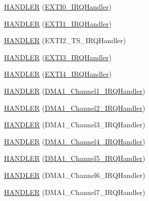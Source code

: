 \begin{DoxyCompactItemize}
\item 
\hyperlink{group___p_i_o_s_ga4d34c7117246e20017f92377a86ef1d8}{H\-A\-N\-D\-L\-E\-R} (\hyperlink{group___p_i_o_s___e_x_t_i_ga17e9789a29a87d2df54f12b94dd1a0b6}{E\-X\-T\-I0\-\_\-\-I\-R\-Q\-Handler})
\item 
\hyperlink{group___p_i_o_s_ga45e5b700a5acc59f46c85542ef3ced58}{H\-A\-N\-D\-L\-E\-R} (\hyperlink{group___p_i_o_s___e_x_t_i_ga49cfdd46eb8d0ef3e1987514aa9343dc}{E\-X\-T\-I1\-\_\-\-I\-R\-Q\-Handler})
\item 
\hyperlink{group___p_i_o_s_ga0447579d55e271d7a793046ae6eca6e4}{H\-A\-N\-D\-L\-E\-R} (E\-X\-T\-I2\-\_\-\-T\-S\-\_\-\-I\-R\-Q\-Handler)
\item 
\hyperlink{group___p_i_o_s_gaad3527eb1b913871844c4e19b1208781}{H\-A\-N\-D\-L\-E\-R} (\hyperlink{group___p_i_o_s___e_x_t_i_ga30c045de96d18ec9c67a7b9e4350920f}{E\-X\-T\-I3\-\_\-\-I\-R\-Q\-Handler})
\item 
\hyperlink{group___p_i_o_s_ga9b52b435e765f418d0b20373ebf7d3de}{H\-A\-N\-D\-L\-E\-R} (\hyperlink{group___p_i_o_s___e_x_t_i_ga290cb997018c8d85d4b965b4a242842f}{E\-X\-T\-I4\-\_\-\-I\-R\-Q\-Handler})
\item 
\hyperlink{group___p_i_o_s_ga9e2d769f4c4643f6f859b5ef04d6d8df}{H\-A\-N\-D\-L\-E\-R} (\hyperlink{pipxtreme_2board__hw__defs_8c_abd49de55f82b1a0be3edaaf34dbe4b14}{D\-M\-A1\-\_\-\-Channel1\-\_\-\-I\-R\-Q\-Handler})
\item 
\hyperlink{group___p_i_o_s_gadf12505dd17ab67ac8f1ef1acd5722b2}{H\-A\-N\-D\-L\-E\-R} (\hyperlink{group___open_pilot_core_ga4055152a9bfe1072e00247cc351276ba}{D\-M\-A1\-\_\-\-Channel2\-\_\-\-I\-R\-Q\-Handler})
\item 
\hyperlink{group___p_i_o_s_gad3ca30cca745b268027f50e556588fa5}{H\-A\-N\-D\-L\-E\-R} (D\-M\-A1\-\_\-\-Channel3\-\_\-\-I\-R\-Q\-Handler)
\item 
\hyperlink{group___p_i_o_s_ga1d58ca450480446a2c488dc53001f493}{H\-A\-N\-D\-L\-E\-R} (\hyperlink{group___tau_labs_core_ga9cdc63af1166aec768f87546a48bec8d}{D\-M\-A1\-\_\-\-Channel4\-\_\-\-I\-R\-Q\-Handler})
\item 
\hyperlink{group___p_i_o_s_ga3d879eb7c368ae3e534bfcdbff172109}{H\-A\-N\-D\-L\-E\-R} (\hyperlink{pipxtreme_2board__hw__defs_8c_a8e3a6d7ba4b5da3ec8decb912bd80943}{D\-M\-A1\-\_\-\-Channel5\-\_\-\-I\-R\-Q\-Handler})
\item 
\hyperlink{group___p_i_o_s_gade543c66fd60c4e916129eafa94a335c}{H\-A\-N\-D\-L\-E\-R} (D\-M\-A1\-\_\-\-Channel6\-\_\-\-I\-R\-Q\-Handler)
\item 
\hyperlink{group___p_i_o_s_ga6c9ed7169954db94ef46ab39ce85d6f1}{H\-A\-N\-D\-L\-E\-R} (D\-M\-A1\-\_\-\-Channel7\-\_\-\-I\-R\-Q\-Handler)

\end{DoxyCompactItemize}
